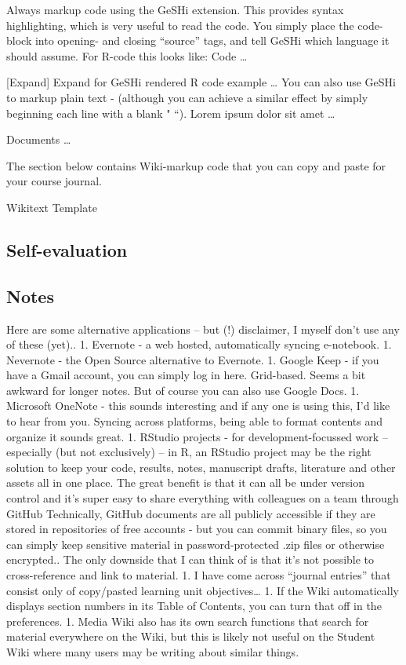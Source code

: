\documentclass[]{book}
\begin{document}
Always markup code using the GeSHi extension. This provides syntax
highlighting, which is very useful to read the code. You simply place
the code-block into opening- and closing ``source'' tags, and tell GeSHi
which language it should assume. For R-code this looks like: Code
\ldots{}

{[}Expand{]} Expand for GeSHi rendered R code example \ldots{} You can
also use GeSHi to markup plain text - (although you can achieve a
similar effect by simply beginning each line with a blank " ``). Lorem
ipsum dolor sit amet \ldots{}

Documents \ldots{}

The section below contains Wiki-markup code that you can copy and paste
for your course journal.

Wikitext Template

\subsection{Self-evaluation}\label{self-evaluation-1}

\subsection{Notes}\label{notes-1}

Here are some alternative applications -- but (!) disclaimer, I myself
don't use any of these (yet).. 1. Evernote - a web hosted, automatically
syncing e-notebook. 1. Nevernote - the Open Source alternative to
Evernote. 1. Google Keep - if you have a Gmail account, you can simply
log in here. Grid-based. Seems a bit awkward for longer notes. But of
course you can also use Google Docs. 1. Microsoft OneNote - this sounds
interesting and if any one is using this, I'd like to hear from you.
Syncing across platforms, being able to format contents and organize it
sounds great. 1. RStudio projects - for development-focussed work --
especially (but not exclusively) -- in R, an RStudio project may be the
right solution to keep your code, results, notes, manuscript drafts,
literature and other assets all in one place. The great benefit is that
it can all be under version control and it's super easy to share
everything with colleagues on a team through GitHub Technically, GitHub
documents are all publicly accessible if they are stored in repositories
of free accounts - but you can commit binary files, so you can simply
keep sensitive material in password-protected .zip files or otherwise
encrypted.. The only downside that I can think of is that it's not
possible to cross-reference and link to material. 1. I have come across
``journal entries'' that consist only of copy/pasted learning unit
objectives\ldots{} 1. If the Wiki automatically displays section numbers
in its Table of Contents, you can turn that off in the preferences. 1.
Media Wiki also has its own search functions that search for material
everywhere on the Wiki, but this is likely not useful on the Student
Wiki where many users may be writing about similar things.
\end{document}
